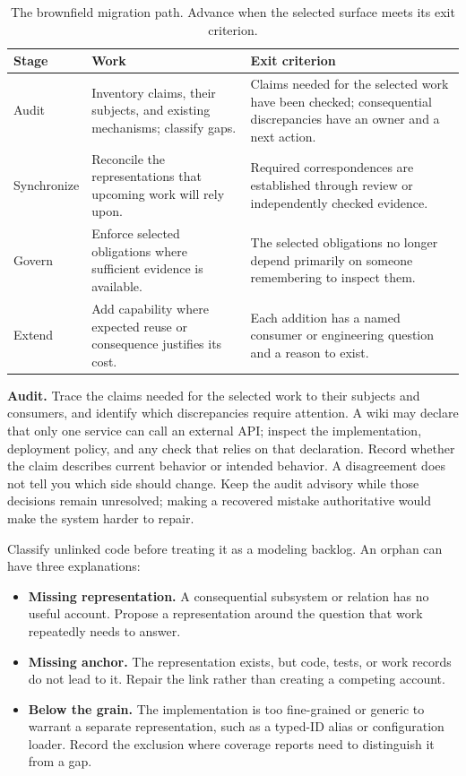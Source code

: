 {\footnotesize
\begin{longtable}[]{@{}p{.16\linewidth}p{.36\linewidth}p{.38\linewidth}@{}}
\caption[Brownfield migration exit criteria]{The brownfield migration path. Advance when the selected surface meets its exit criterion.}\label{practicing-brownfield-exits}\\
\toprule
\textbf{Stage} & \textbf{Work} & \textbf{Exit criterion} \\
\midrule
\endhead
Audit & Inventory claims, their subjects, and existing mechanisms; classify gaps. & Claims needed for the selected work have been checked; consequential discrepancies have an owner and a next action. \\
Synchronize & Reconcile the representations that upcoming work will rely upon. & Required correspondences are established through review or independently checked evidence. \\
Govern & Enforce selected obligations where sufficient evidence is available. & The selected obligations no longer depend primarily on someone remembering to inspect them. \\
Extend & Add capability where expected reuse or consequence justifies its cost. & Each addition has a named consumer or engineering question and a reason to exist. \\
\bottomrule
\end{longtable}
}

\textbf{Audit.} Trace the claims needed for the selected work to their subjects and consumers, and identify which discrepancies require attention. A wiki may declare that only one service can call an external API; inspect the implementation, deployment policy, and any check that relies on that declaration. Record whether the claim describes current behavior or intended behavior. A disagreement does not tell you which side should change. Keep the audit advisory while those decisions remain unresolved; making a recovered mistake authoritative would make the system harder to repair.

Classify unlinked code before treating it as a modeling backlog. An orphan can have three explanations:

\begin{itemize}
\tightlist
\item \textbf{Missing representation.} A consequential subsystem or relation has no useful account. Propose a representation around the question that work repeatedly needs to answer.
\item \textbf{Missing anchor.} The representation exists, but code, tests, or work records do not lead to it. Repair the link rather than creating a competing account.
\item \textbf{Below the grain.} The implementation is too fine-grained or generic to warrant a separate representation, such as a typed-ID alias or configuration loader. Record the exclusion where coverage reports need to distinguish it from a gap.
\end{itemize}

